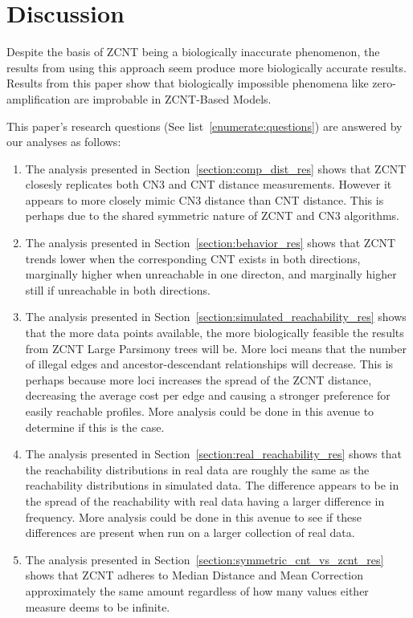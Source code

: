 \section{Discussion}

Despite the basis of ZCNT being a biologically inaccurate phenomenon, the results from using this approach seem produce more biologically accurate results. Results from this paper show that biologically impossible phenomena like zero-amplification are improbable in ZCNT-Based Models. 

This paper's research questions (See list~\ref{enumerate:questions}) are answered by our analyses as follows:

\begin{enumerate}
    \item The analysis presented in Section~\ref{section:comp_dist_res} shows that ZCNT closesly replicates both CN3 and CNT distance measurements. However it appears to more closely mimic CN3 distance than CNT distance. This is perhaps due to the shared symmetric nature of ZCNT and CN3 algorithms. 
    \item The analysis presented in Section~\ref{section:behavior_res} shows that ZCNT trends lower when the corresponding CNT exists in both directions, marginally higher when unreachable in one directon, and marginally higher still if unreachable in both directions. 
    \item The analysis presented in Section~\ref{section:simulated_reachability_res} shows that the more data points available, the more biologically feasible the results from ZCNT Large Parsimony trees will be. More loci means that the number of illegal edges and ancestor-descendant relationships will decrease. This is perhaps because more loci increases the spread of the ZCNT distance, decreasing the average cost per edge and causing a stronger preference for easily reachable profiles. More analysis could be done in this avenue to determine if this is the case. 
    \item The analysis presented in Section~\ref{section:real_reachability_res} shows that the reachability distributions in real data are roughly the same as the reachability distributions in simulated data. The difference appears to be in the spread of the reachability with real data having a larger difference in frequency. More analysis could be done in this avenue to see if these differences are present when run on a larger collection of real data. 
    \item The analysis presented in Section~\ref{section:symmetric_cnt_vs_zcnt_res} shows that ZCNT adheres to Median Distance and Mean Correction approximately the same amount regardless of how many values either measure deems to be infinite. 
\end{enumerate}


